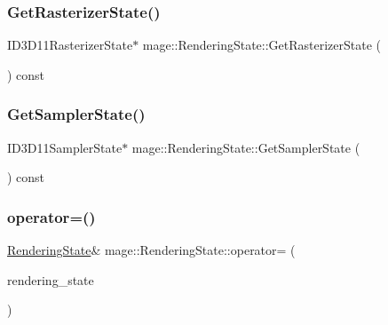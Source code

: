 \hypertarget{structmage_1_1_rendering_state_ac7d1a6360ebd65b9345f9f4e38262fe7}{}\label{structmage_1_1_rendering_state_ac7d1a6360ebd65b9345f9f4e38262fe7} 
\subsubsection{\texorpdfstring{Get\+Rasterizer\+State()}{GetRasterizerState()}}
{\footnotesize\ttfamily I\+D3\+D11\+Rasterizer\+State$\ast$ mage\+::\+Rendering\+State\+::\+Get\+Rasterizer\+State (\begin{DoxyParamCaption}{ }\end{DoxyParamCaption}) const}

\hypertarget{structmage_1_1_rendering_state_a251773f942157b07a7d3272e5e3c8a2e}{}\label{structmage_1_1_rendering_state_a251773f942157b07a7d3272e5e3c8a2e} 
\subsubsection{\texorpdfstring{Get\+Sampler\+State()}{GetSamplerState()}}
{\footnotesize\ttfamily I\+D3\+D11\+Sampler\+State$\ast$ mage\+::\+Rendering\+State\+::\+Get\+Sampler\+State (\begin{DoxyParamCaption}{ }\end{DoxyParamCaption}) const}

\hypertarget{structmage_1_1_rendering_state_af03ad38dd9b88949fc9d3603e4829c26}{}\label{structmage_1_1_rendering_state_af03ad38dd9b88949fc9d3603e4829c26} 
\subsubsection{\texorpdfstring{operator=()}{operator=()}\hspace{0.1cm}{\footnotesize\ttfamily [1/2]}}
{\footnotesize\ttfamily \hyperlink{structmage_1_1_rendering_state}{Rendering\+State}\& mage\+::\+Rendering\+State\+::operator= (\begin{DoxyParamCaption}\item[{const \hyperlink{structmage_1_1_rendering_state}{Rendering\+State} \&}]{rendering\+\_\+state }\end{DoxyParamCaption})\hspace{0.3cm}{\ttfamily [delete]}}

